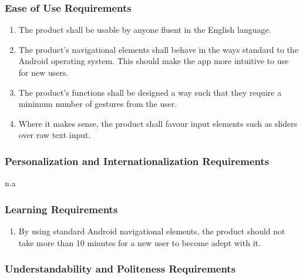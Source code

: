 \documentclass[]{article}
\begin{document}
\subsubsection{Ease of Use Requirements}
\label{ssub:ease_of_use_requirements}
\begin{enumerate}[{UH}1. ]
	\item The product shall be usable by anyone fluent in the English language.
	\item The product's navigational elements shall behave in the ways standard to the Android operating system. This should make the app more intuitive to use for new users. 
	\item The product's functions shall be designed a way such that they require a minimum number of gestures from the user.
	\item Where it makes sense, the product shall favour input elements such as sliders over raw text input.
	\holdEnum
\end{enumerate}

\subsubsection{Personalization and Internationalization Requirements}
\label{ssub:personalization_and_internationalization_requirements}
n.a

\subsubsection{Learning Requirements}
\label{ssub:learning_requirements}
\begin{enumerate}[{UH}1. ]
	\resumeEnum
	\item By using standard Android navigational elements, the product should not take more than 10 minutes for a new user to become adept with it.
	\holdEnum
\end{enumerate}

\subsubsection{Understandability and Politeness Requirements}
\label{ssub:understandability_and_politeness_requirements}
\end{document}

